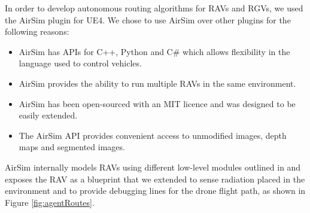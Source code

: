 In order to develop autonomous routing algorithms for RAVs and RGVs, we used the AirSim \cite{airsim2017fsr} plugin for UE4. We chose to use AirSim over other plugins for the following reasons: 
\begin{itemize}
\item AirSim has APIs for C++, Python and C\# which allows flexibility in the language used to control vehicles.
\item AirSim provides the ability to run multiple RAVs in the same environment.
\item AirSim has been open-sourced with an MIT licence and was designed to be easily extended.
\item The AirSim API provides convenient access to unmodified images, depth maps and segmented images.
\end{itemize}
AirSim internally models RAVs using different low-level modules outlined in \cite{airsim2017fsr} and exposes the RAV as a blueprint that we extended to sense radiation placed in the environment and to provide debugging lines for the drone flight path, as shown in Figure \ref{fig:agentRoutes}. 